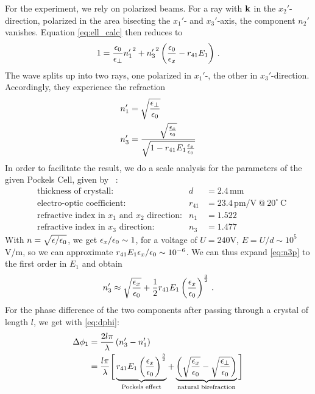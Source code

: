 For the experiment, we rely on polarized beams. For a ray with 
$\mathbf{k}$ in the $x_2'$-direction, polarized in the area bisecting the 
$x_1'$- and $x_3'$-axis, the component $n_2'$ vanishes.
Equation \eqref{eq:ell_calc} then reduces to
\begin{equation}
    1 = \frac{\epsilon_0}{\epsilon_\perp}  {n_1'}^2 + 
    {n_3'}^2 \left(\frac{\epsilon_0}{\epsilon_x} - r_{41} E_1 \right) \, .
    \label{eq:ell_02}
\end{equation}
The wave splits up into two rays, one polarized in $x_1'$-, 
the other in $x_3'$-direction. Accordingly, they experience the refraction 
\begin{align}
    n_1' &= \sqrt{\frac{\epsilon_\perp}{\epsilon_0}} 
    \label{eq:n1p} \\
    n_3' &= \frac{\sqrt{\frac{\epsilon_x}{\epsilon_0}}}{\sqrt{1 - r_{41} E_1 \frac{\epsilon_x}{\epsilon_0}}}
    \label{eq:n3p} 
\end{align}
In order to facilitate the result, we do a scale analysis for the 
parameters of the given Pockels Cell, given by
~\cite{versuchsanleitung}:
\begin{align*}
    &\text{thickness of crystall:} &d &= 2.4 \, \text{mm} \\
    &\text{electro-optic coefficient:} &r_{41} &= 23.4 
        \,\mathrm{pm / V \ @ \ 20^\circ \ C} \\
    &\text{refractive index in $x_1$ and $x_2$ direction:} &n_1 &= 1.522 \\
    &\text{refractive index in $x_3$ direction:} &n_3 &= 1.477 
\end{align*}
With $n = \sqrt{\epsilon / \epsilon_0}$, we get $\epsilon_x / \epsilon_0 \sim 1$, for 
a voltage of $U = 240$V, $E = U / d \sim 10^5$V/m, 
so we can approximate $r_{41} E_1 \epsilon_x / \epsilon_0 \sim 10^{-6}$. 
We can thus expand \eqref{eq:n3p} to the first order in $E_1$ and 
obtain
\begin{equation}
    n_3' \approx \sqrt{\frac{\epsilon_x}{\epsilon_0}} + 
        \frac{1}{2} r_{41} E_1 \left(\frac{\epsilon_x}{\epsilon_0}\right)^\frac{3}{2}
    \label{eq:n3paprrox} \, .
\end{equation}
For the phase difference of the two components after passing through a crystal 
of length $l$, we get with \eqref{eq:dphi}:
\begin{equation}
    \begin{split}
    \Delta \phi_1 
    &= \frac{2l \pi}{\lambda} \left(n_3' - n_1' \right) \\
    &= \frac{l \pi}{\lambda}\Bigg[
    \underbrace{r_{41} E_1 \left(\frac{\epsilon_x}{\epsilon_0}\right)^\frac{3}{2}}_\text{Pockels effect} + 
    \underbrace{\left(\sqrt{\frac{\epsilon_x}{\epsilon_0}} - \sqrt{\frac{\epsilon_\perp}{\epsilon_0}} 
    \right)}_\text{natural birefraction}
    \Bigg]
    \end{split}
    \label{eq:dphi_1}
\end{equation}
